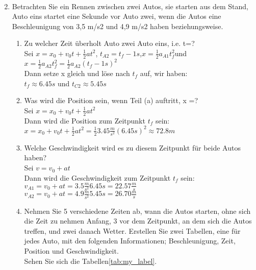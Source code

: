 \documentclass[letterpaper,12pt]{article}
\begin{document}
\begin{enumerate}
\begin{align*}
\end{align*}
 \item {Betrachten Sie ein Rennen zwischen zwei Autos, sie starten aus dem Stand, Auto eins startet eine Sekunde vor Auto zwei, wenn die Autos eine Beschleunigung von 3,5 m/s2 und 4,9 m/s2 haben beziehungsweise.}
    \begin{enumerate}
        \item Zu welcher Zeit überholt Auto zwei Auto eins, i.e. t=?\\
        Sei ${x=x_0+v_0t+\frac{1}{2}at^2}$\hspace{0.5cm}, \hspace{0.5cm}$t_{A2}=t_f-1s$,\hspace{0.5cm}$x=\frac{1}{2}a_{A1}t_f^2$\hspace{0.5cm}und\\$x=\frac{1}{2}a_{A2}t_f^2=\frac{1}{2}a_{A2}(t_f-1s)^2$\\
        Dann setze x gleich und löse nach $t_f$ auf, wir haben:\\$t_{f}\approx6.45s$\hspace{0.2cm} und \hspace{0.2cm}$t_{C2}\approx5.45s$
        
        \item Was wird die Position sein, wenn Teil (a) auftritt, x =?\\
        Sei ${x=x_0+v_0t+\frac{1}{2}at^2}$\\
        Dann wird die Position zum Zeitpunkt $t_f$ sein:\\
        ${x=x_0+v_0t+\frac{1}{2}at^2}=\frac{1}{2}3.45\frac{m}{s^2}(6.45s)^2\approx72.8 m$
        
        \item Welche Geschwindigkeit wird es zu diesem Zeitpunkt für beide Autos haben?\\
        Sei $v=v_0+at$\\
        Dann wird die Geschwindigkeit zum Zeitpunkt $t_f$ sein:\\
        $v_{A1}=v_0+at=3.5\frac{m}{s^2}6.45s=22.57\frac{m}{s}$\\
        $v_{A2}=v_0+at=4.9\frac{m}{s^2}5.45s=26.70\frac{m}{s}$\\
        
        \item Nehmen Sie 5 verschiedene Zeiten ab, wann die Autos starten, ohne sich die Zeit zu nehmen Anfang, 3 vor dem Zeitpunkt, an dem sich die Autos treffen, und zwei danach Wetter. Erstellen Sie zwei Tabellen, eine für jedes Auto, mit den folgenden Informationen; Beschleunigung, Zeit, Position und Geschwindigkeit.\\Sehen Sie sich die Tabellen\ref{tab:my_label}.
    \end{enumerate}


\end{enumerate}
\end{document}
